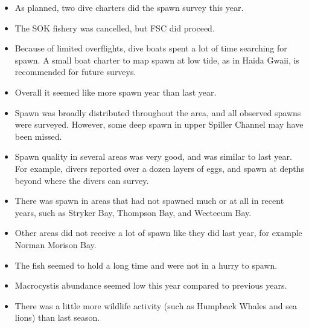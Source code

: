 \begin{itemize}

\item As planned, two dive charters did the spawn survey this year.

\item The SOK fishery was cancelled, but FSC did proceed.

\item Because of limited overflights, dive boats spent a lot of time searching for spawn.
A small boat charter to map spawn at low tide, as in Haida Gwaii, is recommended for future surveys.

\item Overall it seemed like more spawn year than last year.

\item Spawn was broadly distributed throughout the area, and all observed spawns were surveyed.
However, some deep spawn in upper Spiller Channel may have been missed.

\item Spawn quality in several areas was very good, and was similar to last year.
For example, divers reported over a dozen layers of eggs, and spawn at depths beyond where the divers can survey.

\item There was spawn in areas that had not spawned much or at all in recent years, such as Stryker Bay, Thompson Bay, and Weeteeum Bay.

\item Other areas did not receive a lot of spawn like they did last year, for example Norman Morison Bay.

\item The fish seemed to hold a long time and were not in a hurry to spawn.

\item Macrocystis abundance seemed low this year compared to previous years.

\item There was a little more wildlife activity (such as Humpback Whales and sea lions) than last season.

\end{itemize}
